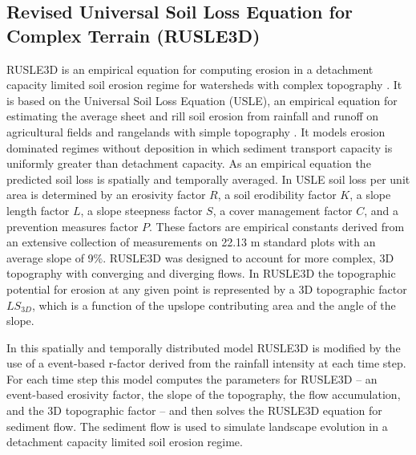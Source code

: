 \documentclass[gmd, manuscript]{copernicus}
\begin{document}
\subsection{Revised Universal Soil Loss Equation for Complex Terrain (RUSLE3D)}
\label{rusle_model}
RUSLE3D
is an empirical equation for computing erosion 
in a detachment capacity limited soil erosion regime
for watersheds with complex topography \citep{Mitasova1996}. 
It is based on 
the Universal Soil Loss Equation (USLE),
an empirical equation for estimating the average
sheet and rill soil erosion from rainfall and runoff
on agricultural fields and rangelands with simple topography 
\citep{Wischmeier1978}. 
It models erosion dominated regimes without deposition
in which sediment transport capacity is 
uniformly greater than detachment capacity.
As an empirical equation the predicted soil loss 
is spatially and temporally averaged. 
In USLE soil loss per unit area is determined by 
an erosivity factor $R$,
a soil erodibility factor $K$, 
a slope length factor $L$,
a slope steepness factor $S$,
a cover management factor $C$,
and a prevention measures factor $P$.
These factors are empirical constants derived 
from an extensive collection of measurements 
on 22.13 \unit{m} standard plots with an average slope of 9$\%$.  
RUSLE3D was designed to account for more complex, 3D topography 
with converging and diverging flows. 
In RUSLE3D the topographic potential for erosion at any given point 
is represented by a 3D topographic factor $LS_{3D}$,
which is a function of the upslope contributing area 
and the angle of the slope. 

In this spatially and temporally distributed model 
RUSLE3D is modified by the use of a 
event-based r-factor derived from the rainfall intensity 
at each time step.
For each time step
this model computes the parameters for RUSLE3D -- 
an event-based erosivity factor,
the slope of the topography, the flow accumulation, and
the 3D topographic factor -- and then
solves the RUSLE3D equation for sediment flow. 
The sediment flow is used to simulate landscape evolution 
in a detachment capacity limited soil erosion regime.


\end{document}
